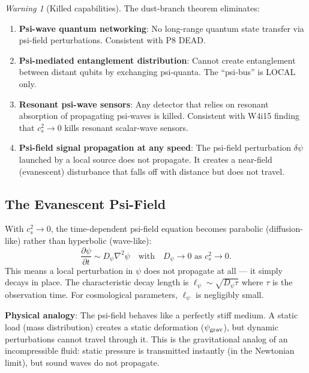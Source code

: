 \documentclass[11pt]{article}
\theoremstyle{definition}
\theoremstyle{remark}
\newtheorem{warning}[theorem]{Warning}
\newcommand{\psigrav}{\psi_{\rm grav}}
\begin{document}
\begin{warning}[Killed capabilities]
  The dust-branch theorem eliminates:
  \begin{enumerate}
    \item \textbf{Psi-wave quantum networking}: No long-range quantum state
      transfer via psi-field perturbations.  Consistent with P8 DEAD.
    \item \textbf{Psi-mediated entanglement distribution}: Cannot create
      entanglement between distant qubits by exchanging psi-quanta.
      The ``psi-bus'' is LOCAL only.
    \item \textbf{Resonant psi-wave sensors}: Any detector that relies on
      resonant absorption of propagating psi-waves is killed.  Consistent
      with W4i15 finding that $c_s^2 \to 0$ kills resonant scalar-wave sensors.
    \item \textbf{Psi-field signal propagation at any speed}: The psi-field
      perturbation $\delta\psi$ launched by a local source does not propagate.
      It creates a near-field (evanescent) disturbance that falls off with
      distance but does not travel.
  \end{enumerate}
\end{warning}

\subsection{The Evanescent Psi-Field}

With $c_s^2 \to 0$, the time-dependent psi-field equation becomes parabolic
(diffusion-like) rather than hyperbolic (wave-like):
\begin{equation}
  \frac{\partial \psi}{\partial t} \sim D_\psi \nabla^2 \psi
  \quad \text{with} \quad D_\psi \to 0 \text{ as } c_s^2 \to 0.
\end{equation}
This means a local perturbation in $\psi$ does not propagate at all --- it
simply decays in place.  The characteristic decay length is
$\ell_\psi \sim \sqrt{D_\psi \tau}$ where $\tau$ is the observation time.
For cosmological parameters, $\ell_\psi$ is negligibly small.

\textbf{Physical analogy}: The psi-field behaves like a perfectly stiff medium.
A static load (mass distribution) creates a static deformation ($\psigrav$),
but dynamic perturbations cannot travel through it.  This is the gravitational
analog of an incompressible fluid: static pressure is transmitted instantly
(in the Newtonian limit), but sound waves do not propagate.
\end{document}

